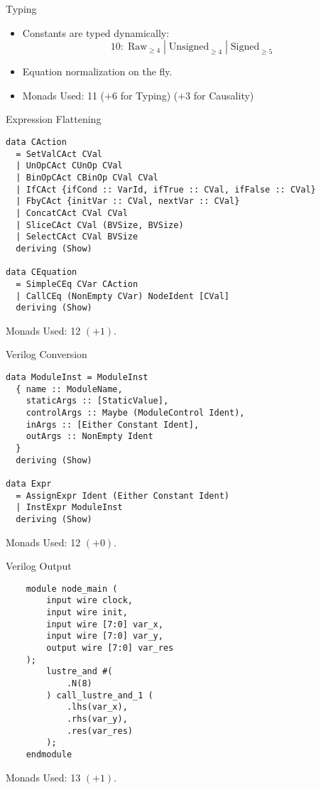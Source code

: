 \documentclass{beamer}
\DeclareMathOperator{\Signed}{Signed}
\DeclareMathOperator{\Unsigned}{Unsigned}
\DeclareMathOperator{\Raw}{Raw}
\begin{document}
\begin{frame}{Typing}
    \begin{itemize}
        \setlength{\itemsep}{8pt}
        \item Constants are typed dynamically:
              \[10: \Raw_{\geqslant 4}|\Unsigned_{\geqslant 4}|\Signed_{\geqslant 5}\]
        \item Equation normalization on the fly.
        \item Monads Used: 11
              ($+6$ for Typing)
              ($+3$ for Causality)
    \end{itemize}
\end{frame}

\begin{frame}[fragile]{Expression Flattening}
    \begin{small}
        \begin{verbatim}
data CAction
  = SetValCAct CVal
  | UnOpCAct CUnOp CVal
  | BinOpCAct CBinOp CVal CVal
  | IfCAct {ifCond :: VarId, ifTrue :: CVal, ifFalse :: CVal}
  | FbyCAct {initVar :: CVal, nextVar :: CVal}
  | ConcatCAct CVal CVal
  | SliceCAct CVal (BVSize, BVSize)
  | SelectCAct CVal BVSize
  deriving (Show)

data CEquation
  = SimpleCEq CVar CAction
  | CallCEq (NonEmpty CVar) NodeIdent [CVal]
  deriving (Show)
        \end{verbatim}
    \end{small}

    Monads Used: 12 $(+ 1)$.
\end{frame}

\begin{frame}[fragile]{Verilog Conversion}
    \begin{small}
        \begin{verbatim}
data ModuleInst = ModuleInst
  { name :: ModuleName,
    staticArgs :: [StaticValue],
    controlArgs :: Maybe (ModuleControl Ident),
    inArgs :: [Either Constant Ident],
    outArgs :: NonEmpty Ident
  }
  deriving (Show)

data Expr
  = AssignExpr Ident (Either Constant Ident)
  | InstExpr ModuleInst
  deriving (Show)
        \end{verbatim}
    \end{small}

    Monads Used: 12 $(+ 0)$.
\end{frame}

\begin{frame}[fragile]{Verilog Output}
    \begin{small}
        \begin{verbatim}
    module node_main (
        input wire clock,
        input wire init,
        input wire [7:0] var_x,
        input wire [7:0] var_y,
        output wire [7:0] var_res
    );
        lustre_and #(
            .N(8)
        ) call_lustre_and_1 (
            .lhs(var_x),
            .rhs(var_y),
            .res(var_res)
        );
    endmodule
        \end{verbatim}
    \end{small}

    Monads Used: 13 $(+ 1)$.
\end{frame}
\end{document}
